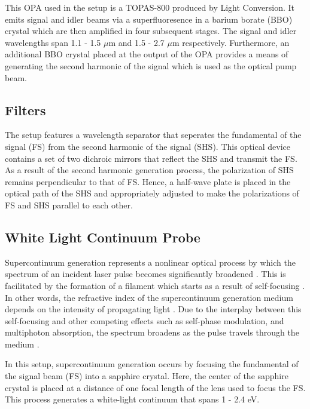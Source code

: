 This OPA used in the setup is a TOPAS-800 produced by Light Conversion. It emits signal and idler beams via a superfluoresence in a barium borate (BBO) crystal which are then amplified in four subsequent stages. The signal and idler wavelengths span 1.1 - 1.5 $\mu$m  and 1.5 - 2.7 $\mu$m respectively. Furthermore, an additional BBO crystal placed at the output of the OPA provides a means of generating the second harmonic of the signal which is used as the optical pump beam.

\subsection{Filters}

The setup features a wavelength separator that seperates the fundamental of the signal (FS) from the second harmonic of the signal (SHS). This optical device contains a set of two dichroic mirrors that reflect the SHS and transmit the FS. As a result of the second harmonic generation process, the polarization of SHS remains perpendicular to that of FS. Hence, a half-wave plate is placed in the optical path of the SHS and appropriately adjusted to make the polarizations of FS and SHS parallel to each other. 
 
\subsection{White Light Continuum Probe}


\label{section:white_light_probe}
Supercontinuum generation represents a nonlinear optical process by which the spectrum of an incident laser pulse becomes significantly broadened \cite{dubietis2017ultrafast}. This is facilitated by the formation of a filament which starts as a result of self-focusing \cite{dubietis2017ultrafast}. In other words, the refractive index of the supercontinuum generation medium depends on the intensity of propagating light \cite{dubietis2017ultrafast}. Due to the interplay between this self-focusing and other competing effects such as self-phase modulation, and multiphoton absorption, the spectrum  broadens as the pulse travels through the medium \cite{dubietis2017ultrafast}. 

In this setup, supercontinuum generation occurs by focusing the fundamental of the signal beam (FS) into a sapphire crystal. Here, the center of the sapphire crystal is placed at a distance of one focal length of the lens used to focus the FS. This process generates a white-light continuum that spans 1 - 2.4 eV. 

